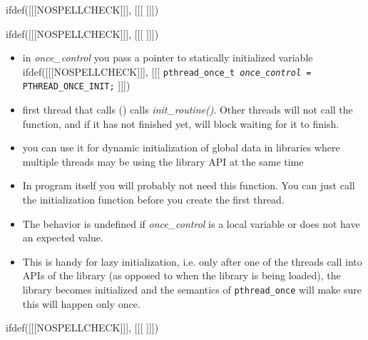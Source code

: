 
ifdef([[[NOSPELLCHECK]]], [[[
]]])

\begin{slide}
ifdef([[[NOSPELLCHECK]]], [[[
]]])
\begin{itemize}
\item in \emph{once\_control} you pass a pointer to statically initialized
variable
ifdef([[[NOSPELLCHECK]]], [[[
\texttt{pthread\_once\_t \emph{once\_control} = PTHREAD\_ONCE\_INIT;}
]]])
\item first thread that calls () calls
\emph{init\_routine()}.  Other threads will not call the function, and if it has
not finished yet, will block waiting for it to finish.
\item you can use it for dynamic initialization of global data in libraries
where multiple threads may be using the library API at the same time
\end{itemize}
\end{slide}

\begin{itemize}
\item In program itself you will probably not need this function.  You can
just call the initialization function before you create the first thread.
\item The behavior is undefined if \emph{once\_control} is a local variable or
does not have an expected value.
\item This is handy for lazy initialization, i.e. only after one of the threads
call into APIs of the library (as opposed to when the library is being loaded),
the library becomes initialized and the semantics of \texttt{pthread\_once}
will make sure this will happen only once.
\end{itemize}


ifdef([[[NOSPELLCHECK]]], [[[
]]])

